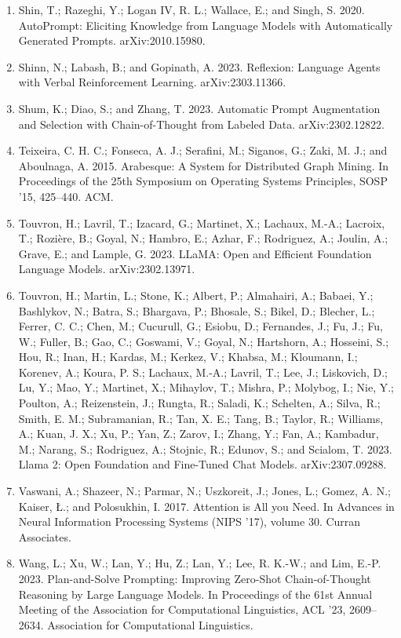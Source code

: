 \documentclass[11pt,UTF8,fontset=fandol]{ctexart}
\begin{document}
\begin{enumerate}[leftmargin=2em]
\item Shin, T.; Razeghi, Y.; Logan IV, R. L.; Wallace, E.; and Singh, S. 2020. AutoPrompt: Eliciting Knowledge from Language Models with Automatically Generated Prompts. arXiv:2010.15980.
\item Shinn, N.; Labash, B.; and Gopinath, A. 2023. Reflexion: Language Agents with Verbal Reinforcement Learning. arXiv:2303.11366.
\item Shum, K.; Diao, S.; and Zhang, T. 2023. Automatic Prompt Augmentation and Selection with Chain-of-Thought from Labeled Data. arXiv:2302.12822.
\item Teixeira, C. H. C.; Fonseca, A. J.; Serafini, M.; Siganos, G.; Zaki, M. J.; and Aboulnaga, A. 2015. Arabesque: A System for Distributed Graph Mining. In Proceedings of the 25th Symposium on Operating Systems Principles, SOSP '15, 425--440. ACM.
\item Touvron, H.; Lavril, T.; Izacard, G.; Martinet, X.; Lachaux, M.-A.; Lacroix, T.; Rozière, B.; Goyal, N.; Hambro, E.; Azhar, F.; Rodriguez, A.; Joulin, A.; Grave, E.; and Lample, G. 2023. LLaMA: Open and Efficient Foundation Language Models. arXiv:2302.13971.
\item Touvron, H.; Martin, L.; Stone, K.; Albert, P.; Almahairi, A.; Babaei, Y.; Bashlykov, N.; Batra, S.; Bhargava, P.; Bhosale, S.; Bikel, D.; Blecher, L.; Ferrer, C. C.; Chen, M.; Cucurull, G.; Esiobu, D.; Fernandes, J.; Fu, J.; Fu, W.; Fuller, B.; Gao, C.; Goswami, V.; Goyal, N.; Hartshorn, A.; Hosseini, S.; Hou, R.; Inan, H.; Kardas, M.; Kerkez, V.; Khabsa, M.; Kloumann, I.; Korenev, A.; Koura, P. S.; Lachaux, M.-A.; Lavril, T.; Lee, J.; Liskovich, D.; Lu, Y.; Mao, Y.; Martinet, X.; Mihaylov, T.; Mishra, P.; Molybog, I.; Nie, Y.; Poulton, A.; Reizenstein, J.; Rungta, R.; Saladi, K.; Schelten, A.; Silva, R.; Smith, E. M.; Subramanian, R.; Tan, X. E.; Tang, B.; Taylor, R.; Williams, A.; Kuan, J. X.; Xu, P.; Yan, Z.; Zarov, I.; Zhang, Y.; Fan, A.; Kambadur, M.; Narang, S.; Rodriguez, A.; Stojnic, R.; Edunov, S.; and Scialom, T. 2023. Llama 2: Open Foundation and Fine-Tuned Chat Models. arXiv:2307.09288.
\item Vaswani, A.; Shazeer, N.; Parmar, N.; Uszkoreit, J.; Jones, L.; Gomez, A. N.; Kaiser, Ł.; and Polosukhin, I. 2017. Attention is All you Need. In Advances in Neural Information Processing Systems (NIPS '17), volume 30. Curran Associates.
\item Wang, L.; Xu, W.; Lan, Y.; Hu, Z.; Lan, Y.; Lee, R. K.-W.; and Lim, E.-P. 2023. Plan-and-Solve Prompting: Improving Zero-Shot Chain-of-Thought Reasoning by Large Language Models. In Proceedings of the 61st Annual Meeting of the Association for Computational Linguistics, ACL '23, 2609--2634. Association for Computational Linguistics.

\end{enumerate}
\end{document}
